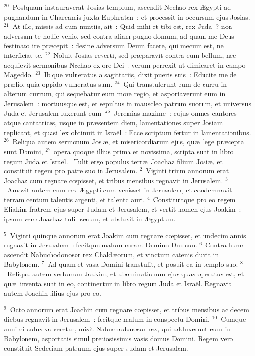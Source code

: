 ${}^{20}$~Postquam instauraverat Josias templum, ascendit Nechao rex \AE gypti ad pugnandum in Charcamis juxta Euphraten~: et processit in occursum ejus Josias.
${}^{21}$~At ille, missis ad eum nuntiis, ait~: Quid mihi et tibi est, rex Juda~? non adversum te hodie venio, sed contra aliam pugno domum, ad quam me Deus festinato ire pr\ae cepit~: desine adversum Deum facere, qui mecum est, ne interficiat te.
${}^{22}$~Noluit Josias reverti, sed pr\ae paravit contra eum bellum, nec acquievit sermonibus Nechao ex ore Dei~: verum perrexit ut dimicaret in campo Mageddo.
${}^{23}$~Ibique vulneratus a sagittariis, dixit pueris suis~: Educite me de pr\ae lio, quia oppido vulneratus sum.
${}^{24}$~Qui transtulerunt eum de curru in alterum currum, qui sequebatur eum more regio, et asportaverunt eum in Jerusalem~: mortuusque est, et sepultus in mausoleo patrum suorum, et universus Juda et Jerusalem luxerunt eum.
${}^{25}$~Jeremias maxime~: cujus omnes cantores atque cantatrices, usque in pr\ae sentem diem, lamentationes super Josiam replicant, et quasi lex obtinuit in Isra\"el~: Ecce scriptum fertur in lamentationibus.
${}^{26}$~Reliqua autem sermonum Josi\ae , et misericordiarum ejus, qu\ae\ lege pr\ae cepta sunt Domini,
${}^{27}$~opera quoque illius prima et novissima, scripta sunt in libro regum Juda et Isra\"el.
~Tulit ergo populus terr\ae\ Joachaz filium Josi\ae , et constituit regem pro patre suo in Jerusalem.
${}^{2}$~Viginti trium annorum erat Joachaz cum regnare cœpisset, et tribus mensibus regnavit in Jerusalem.
${}^{3}$~Amovit autem eum rex \AE gypti cum venisset in Jerusalem, et condemnavit terram centum talentis argenti, et talento auri.
${}^{4}$~Constituitque pro eo regem Eliakim fratrem ejus super Judam et Jerusalem, et vertit nomen ejus Joakim~: ipsum vero Joachaz tulit secum, et abduxit in \AE gyptum.


${}^{5}$~Viginti quinque annorum erat Joakim cum regnare cœpisset, et undecim annis regnavit in Jerusalem~: fecitque malum coram Domino Deo suo.
${}^{6}$~Contra hunc ascendit Nabuchodonosor rex Chald\ae orum, et vinctum catenis duxit in Babylonem.
${}^{7}$~Ad quam et vasa Domini transtulit, et posuit ea in templo suo.
${}^{8}$~Reliqua autem verborum Joakim, et abominationum ejus quas operatus est, et qu\ae\ inventa sunt in eo, continentur in libro regum Juda et Isra\"el. Regnavit autem Joachin filius ejus pro eo.


${}^{9}$~Octo annorum erat Joachin cum regnare cœpisset, et tribus mensibus ac decem diebus regnavit in Jerusalem~: fecitque malum in conspectu Domini.
${}^{10}$~Cumque anni circulus volveretur, misit Nabuchodonosor rex, qui adduxerunt eum in Babylonem, asportatis simul pretiosissimis vasis domus Domini. Regem vero constituit Sedeciam patruum ejus super Judam et Jerusalem.


